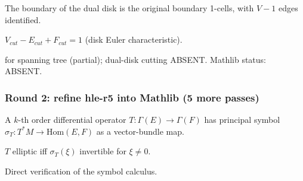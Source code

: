 \begin{lemma}
\label{lem:pct-r8}
The boundary of the dual disk is the original boundary 1-cells, with $V - 1$ edges identified.
\leanok
\end{lemma}

\begin{lemma}
\label{lem:pct-r9}
$V_{cut} - E_{cut} + F_{cut} = 1$ (disk Euler characteristic).
\leanok
\end{lemma}

\begin{lemma}
\label{lem:pct-r10}
 for spanning tree (partial); dual-disk cutting ABSENT.  Mathlib status: ABSENT.
\leanok
\end{lemma}

\subsubsection*{Round 2: refine hle-r5 into Mathlib (5 more passes)}

\begin{lemma}
\label{lem:hle-r6}
A $k$-th order differential operator $T : \Gamma(E) \to \Gamma(F)$ has principal symbol $\sigma_{T} : T^{*}M \to \mathrm{Hom}(E, F)$ as a vector-bundle map.
\leanok
\end{lemma}

\begin{lemma}[Pass hle.7: ellipticity = invertible principal symbol]
\label{lem:hle-r7}
$T$ elliptic iff $\sigma_{T}(\xi)$ invertible for $\xi \neq 0$.
\leanok
\end{lemma}

\begin{lemma}[Pass hle.8: $\Delta = dd^{*} + d^{*}d$ as elliptic order-2 operator]
\label{lem:hle-r8}
Direct verification of the symbol calculus.
\leanok
\end{lemma}

